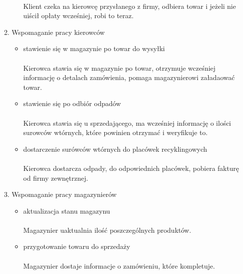 \begin{enumerate}
\begin{itemize}
		\paragraph{} Klient czeka na kierowcę przysłanego z firmy, odbiera towar i jeżeli nie uiścił opłaty wcześniej, robi to teraz.
		\end{itemize}
	\item Wspomaganie pracy kierowców
		\begin{itemize}
		\item stawienie się w magazynie po towar do wysyłki 
		\paragraph{} Kierowca stawia się w magazynie po towar, otrzymuje wcześniej informację o detalach zamówienia, pomaga magazynierowi załadaować towar.
		\item stawienie się po odbiór odpadów 
		\paragraph{} Kierowca stawia się u sprzedającego, ma wcześniej informację o ilości surowców wtórnych, które powinien otrzymać i weryfikuje to.
		\item dostarczenie surówców wtórnych do placówek recyklingowych 
		\paragraph{} Kierowca dostarcza odpady, do odpowiednich placówek, pobiera fakturę od firmy zewnętrznej.
		\end{itemize}
	\item Wspomaganie pracy magazynierów
		\begin{itemize}
		\item aktualizacja stanu magazynu 
	 	\paragraph{} Magazynier uaktualnia ilość poszczególnych produktów.
	 	\item przygotowanie towaru do sprzedaży 
	 	\paragraph{} Magazynier dostaje informacje o zamówieniu, które kompletuje.
		\end{itemize}
\end{enumerate}